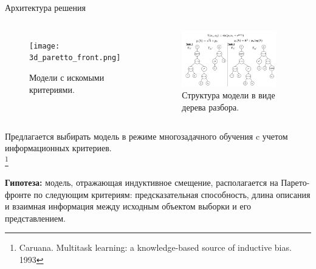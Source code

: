 \documentclass{beamer}
\newcommand\blfootnote[1]{%
\begingroup
\renewcommand\thefootnote{}\footnote{#1}%
\addtocounter{footnote}{-1}%
\endgroup
}
\begin{document}
\begin{frame}{Архитектура решения}
\begin{columns}[c]
\begin{figure}
    \texttt{[image: 3d\_paretto\_front.png]}
    \caption{\scriptsize Модели с искомыми критериями.}
\end{figure}
\begin{figure}
    \includegraphics[width=0.9\textwidth]{expression_tree.drawio.pdf}
    \caption{\scriptsize Структура модели в виде дерева разбора.}
\end{figure}
\end{columns}
{\scriptsize \setlength{\baselineskip}{\baselineskip} Предлагается выбирать модель в режиме многозадачного обучения c учетом информационных критериев.\\}\blfootnote{\scriptsize Caruana. Multitask learning: a knowledge-based source of inductive bias. 1993}
{\scriptsize \setlength{\baselineskip}{\baselineskip} \textbf{Гипотеза:} модель, отражающая индуктивное смещение, располагается на Парето-фронте по следующим критериям: предсказательная способность, длина описания и взаимная информация между исходным объектом выборки и его представлением.\\}
\end{frame}
\end{document}
